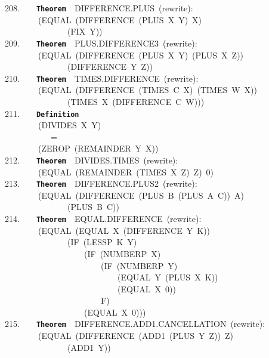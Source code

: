 \documentclass[11pt]{book}
\newenvironment{pubasis}{\begin{flushleft}\ttfamily\small}{\normalsize\rmfamily\end{flushleft}}
\newcommand{\axiomordefinition}[1]{\vspace{6pt}\texttt{\textbf{#1}}}
\begin{document}
\begin{pubasis}
208.~~~~\axiomordefinition{Theorem}~~DIF\-FER\-ENCE.PLUS~(rewrite):\\
~~~~~~~~(EQUAL~(DIFFERENCE~(PLUS~X~Y)~X)\\
~~~~~~~~~~~~~~~(FIX~Y))\\

209.~~~~\axiomordefinition{Theorem}~~PLUS.DIF\-FER\-ENCE3~(rewrite):\\
~~~~~~~~(EQUAL~(DIFFERENCE~(PLUS~X~Y)~(PLUS~X~Z))\\
~~~~~~~~~~~~~~~(DIFFERENCE~Y~Z))\\

210.~~~~\axiomordefinition{Theorem}~~TIMES.DIF\-FER\-ENCE~(rewrite):\\
~~~~~~~~(EQUAL~(DIFFERENCE~(TIMES~C~X)~(TIMES~W~X))\\
~~~~~~~~~~~~~~~(TIMES~X~(DIFFERENCE~C~W)))\\

211.~~~~\axiomordefinition{Definition}\\
~~~~~~~~(DIVIDES~X~Y)\\
~~~~~~~~~~~=\\
~~~~~~~~(ZEROP~(REMAINDER~Y~X))\\

212.~~~~\axiomordefinition{Theorem}~~DIVIDES.TIMES~(rewrite):\\
~~~~~~~~(EQUAL~(REMAINDER~(TIMES~X~Z)~Z)~0)\\

213.~~~~\axiomordefinition{Theorem}~~DIF\-FER\-ENCE.PLUS2~(rewrite):\\
~~~~~~~~(EQUAL~(DIFFERENCE~(PLUS~B~(PLUS~A~C))~A)\\
~~~~~~~~~~~~~~~(PLUS~B~C))\\

214.~~~~\axiomordefinition{Theorem}~~EQUAL.DIF\-FER\-ENCE~(rewrite):\\
~~~~~~~~(EQUAL~(EQUAL~X~(DIFFERENCE~Y~K))\\
~~~~~~~~~~~~~~~(IF~(LESSP~K~Y)\\
~~~~~~~~~~~~~~~~~~~(IF~(NUMBERP~X)\\
~~~~~~~~~~~~~~~~~~~~~~~(IF~(NUMBERP~Y)\\
~~~~~~~~~~~~~~~~~~~~~~~~~~~(EQUAL~Y~(PLUS~X~K))\\
~~~~~~~~~~~~~~~~~~~~~~~~~~~(EQUAL~X~0))\\
~~~~~~~~~~~~~~~~~~~~~~~F)\\
~~~~~~~~~~~~~~~~~~~(EQUAL~X~0)))\\

215.~~~~\axiomordefinition{Theorem}~~DIF\-FER\-ENCE.ADD1.CAN\-CELLATION~(rewrite):\\
~~~~~~~~(EQUAL~(DIFFERENCE~(ADD1~(PLUS~Y~Z))~Z)\\
~~~~~~~~~~~~~~~(ADD1~Y))\\


\end{pubasis}
\end{document}
